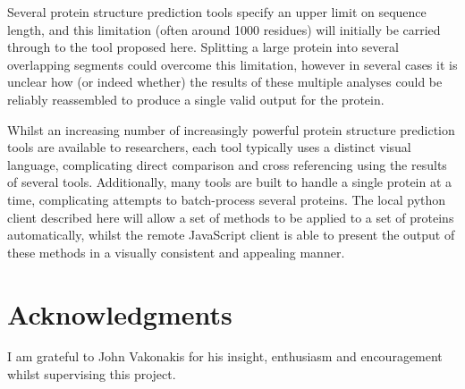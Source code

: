 \documentclass[fleqn,10pt]{article} %
\begin{document}
Several protein structure prediction tools specify an upper limit on sequence length, and this limitation (often around 1000 residues) will initially be carried through to the tool proposed here. Splitting a large protein into several overlapping segments could overcome this limitation, however in several cases it is unclear how (or indeed whether) the results of these multiple analyses could be reliably reassembled to produce a single valid output for the protein.

Whilst an increasing number of increasingly powerful protein structure prediction tools are available to researchers, each tool typically uses a distinct visual language, complicating direct comparison and cross referencing using the results of several tools. Additionally, many tools are built to handle a single protein at a time, complicating attempts to batch-process several proteins. The local python client described here will allow a set of methods to be applied to a set of proteins automatically, whilst the remote JavaScript client is able to present the output of these methods in a visually consistent and appealing manner.

\section*{Acknowledgments}

I am grateful to John Vakonakis for his insight, enthusiasm and encouragement whilst supervising this project.




\end{document}
